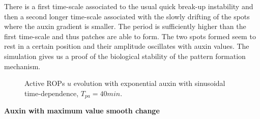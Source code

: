 There is a first time-scale associated to the usual quick break-up instability and then a second longer time-scale associated with the slowly drifting of the spots where the auxin gradient is smaller. The period is sufficiently higher than the first time-scale and thus patches are able to form.  The two spots formed seem to rest in a certain position and their amplitude oscillates with auxin values. The simulation gives us a proof of the biological stability of the pattern formation mechanism.
\begin{figure}[t]
    \centering
    \quad
    \quad
    \quad
    \quad
    \quad
    \quad
    \quad
    \quad
    \quad
    \quad
    \caption[RR with time dependent auxin - periodic $T_{pa} = 40 min$]{Active ROPs $u$ evolution with exponential auxin with sinusoidal time-dependence, $T_{pa} = 40 min$.}
    \label{fig:LauxT40m}
\end{figure}

\textbf{Auxin with maximum value smooth change}

